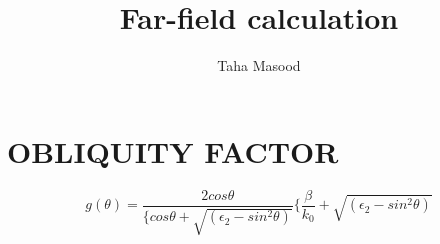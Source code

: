\documentclass[]{spie}
\title{Far-field calculation}
\author{Taha Masood}
\begin{document}
\maketitle

\section{OBLIQUITY FACTOR}
\begin{equation}
g(\theta) = \frac{2 cos\theta}{\{cos\theta + \sqrt{(\epsilon_2 - sin^2\theta)}}\{\frac{\beta}{k_0} + \sqrt{(\epsilon_2 - sin^2\theta)}
\end{equation}
\end{document}
